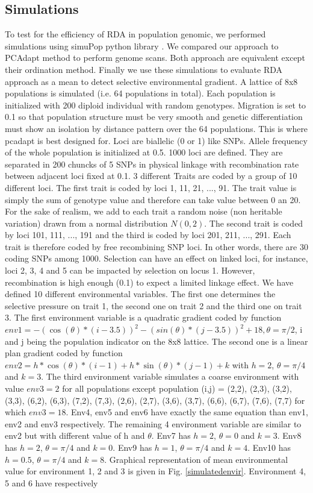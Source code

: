 \documentclass[nogrid]{MBE}%
\begin{document}
\subsection{Simulations}

To test for the efficiency of RDA in population genomic, we performed simulations using simuPop python library \citep{Peng2005}. We compared our approach to PCAdapt method to perform genome scans. Both approach are equivalent except their ordination method. Finally we use these simulations to evaluate RDA approach as a mean to detect selective environmental gradient.
	A lattice of 8x8 populations is simulated (i.e. 64 populations in total). Each population is initialized with 200 diploid individual with random genotypes. Migration is set to 0.1 so that population structure must be very smooth and genetic differentiation must show an isolation by distance pattern over the 64 populations. This is where pcadapt is best designed for. Loci are biallelic (0 or 1) like SNPs. Allele frequency of the whole population is initialized at 0.5. 1000 loci are defined. They are separated in 200 chuncks of 5 SNPs in physical linkage with recombination rate between adjacent loci fixed at 0.1. 3 different Traits are coded by a group of 10 different loci. The first trait is coded by loci 1, 11, 21, ..., 91. The trait value is simply the sum of genotype value and therefore can take value between 0 an 20. For the sake of realism, we add to each trait a random noise (non heritable variation) drawn from a normal distribution $N(0,2)$. The second trait is coded by loci 101, 111, ..., 191 and the third is coded by loci 201, 211, ..., 291. Each trait is therefore coded by free recombining SNP loci. In other words, there are 30 coding SNPs among 1000. Selection can have an effect on linked loci, for instance, loci 2, 3, 4 and 5 can be impacted by selection on locus 1. However, recombination is high enough (0.1) to expect a limited linkage effect. We have defined 10 different environmental variables. The first one determines the selective pressure on trait 1, the second one on trait 2 and the third one on trait 3. The first environment variable is a quadratic gradient coded by function  $env1 = -(\cos(\theta)*(i-3.5))^2 -(sin(\theta)*(j-3.5))^2 + 18, \theta = \pi/2$, i and j being the population indicator on the 8x8 lattice. The second one is a linear plan gradient coded by function $env2 = h*\cos(\theta)*(i-1) + h*\sin(\theta)*(j-1) + k$ with $h=2$, $\theta = \pi/4$ and $k=3$. The third environment variable simulates a coarse environment with value $env3 = 2$ for all populations except population (i,j) = {(2,2), (2,3), (3,2), (3,3), (6,2), (6,3), (7,2), (7,3), (2,6), (2,7), (3,6), (3,7), (6,6), (6,7), (7,6), (7,7)} for which $env3 = 18$. Env4, env5 and env6 have exactly the same equation than env1, env2 and env3 respectively. The remaining 4 environment variable are similar to env2 but with different value of h and $\theta$. Env7 has $h=2$, $\theta = 0$ and $k=3$. Env8 has $h=2$, $\theta = \pi/4$ and $k=0$. Env9 has $h=1$, $\theta = \pi/4$ and $k=4$. Env10 has $h=0.5$, $\theta = \pi/4$ and $k=8$. Graphical representation of mean environmental value for environment 1, 2 and 3 is given in Fig. \ref{simulatedenvir}. Environment 4, 5 and 6 have respectively 
\end{document}
